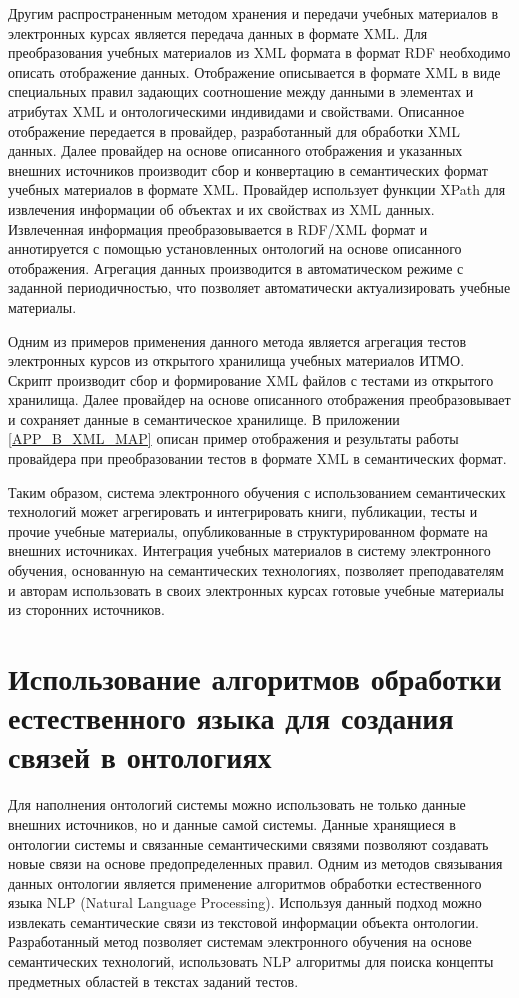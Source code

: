 Другим распространенным методом хранения и передачи учебных материалов в электронных курсах является передача данных в формате XML. Для преобразования учебных материалов из XML формата в формат RDF необходимо описать отображение данных. Отображение описывается в формате XML в виде специальных правил задающих соотношение между данными в элементах и атрибутах XML и онтологическими индивидами и свойствами. Описанное отображение передается в провайдер, разработанный для обработки XML данных. Далее провайдер на основе описанного отображения и указанных внешних источников производит сбор и конвертацию в семантических формат учебных материалов в формате XML. Провайдер использует функции XPath для извлечения информации об объектах и их свойствах из XML данных. Извлеченная информация преобразовывается в RDF/XML формат и аннотируется с помощью установленных онтологий на основе описанного отображения. Агрегация данных производится в автоматическом режиме с заданной периодичностью, что позволяет автоматически актуализировать учебные материалы.

Одним из примеров применения данного метода является агрегация тестов электронных курсов из открытого хранилища учебных материалов ИТМО. Скрипт производит сбор и формирование XML файлов с тестами из открытого хранилища. Далее провайдер на основе описанного отображения преобразовывает и сохраняет данные в семантическое хранилище. В приложении \ref{APP_B_XML_MAP} описан пример отображения и результаты работы провайдера при преобразовании тестов в формате XML в семантических формат.

Таким образом, система электронного обучения с использованием семантических технологий может агрегировать и интегрировать книги, публикации, тесты и прочие учебные материалы, опубликованные в структурированном формате на внешних источниках. Интеграция учебных материалов в систему электронного обучения, основанную на семантических технологиях, позволяет преподавателям и авторам использовать в своих электронных курсах готовые учебные материалы из сторонних источников.  



\section{Использование алгоритмов обработки естественного языка для создания связей в онтологиях} \label{sect3_3}

Для наполнения онтологий системы можно использовать не только данные внешних источников, но и данные самой системы. Данные хранящиеся в онтологии системы и связанные семантическими связями позволяют создавать новые связи на основе предопределенных правил. Одним из методов связывания данных онтологии является применение алгоритмов обработки естественного языка NLP (Natural Language Processing). Используя данный подход можно извлекать семантические связи из текстовой информации объекта онтологии. Разработанный метод позволяет системам электронного обучения на основе семантических технологий, использовать NLP алгоритмы для поиска концепты предметных областей в текстах заданий тестов.

